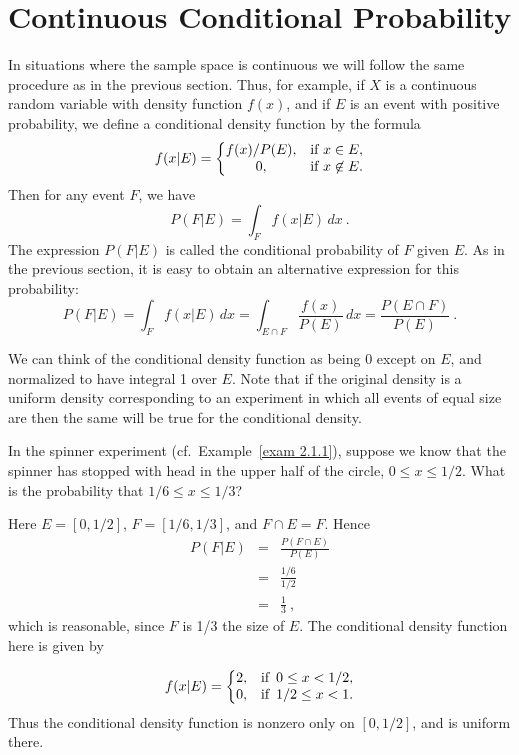 \begin{LJSItem}
\end{LJSItem}

\section{Continuous Conditional Probability}\label{sec 4.2}

In situations where the sample space is continuous we will follow the same procedure as in the
previous section.  Thus, for example, if $X$ is a continuous random variable with density function
$f(x)$, and if $E$ is an event with positive probability, we define a conditional
density function by the formula
$$ f(x|E) = \left \{ \begin{matrix}
 f(x)/P(E), &  \mbox{if} \,\,x \in E,       \cr
         0, & \mbox{if}\,\,x \not \in E.  \cr\end{matrix}\right.        
$$
Then for any event $F$, we have
$$ 
P(F|E) = \int_F f(x|E)\,dx\ .
$$
The expression $P(F|E)$ is called the conditional probability of $F$ given $E$.  As in the previous
section, it is easy to obtain an alternative expression for this probability:
$$
P(F|E) = \int_F f(x|E)\,dx = \int_{E\cap F} \frac {f(x)}{P(E)}\,dx = \frac {P(E\cap F)}{P(E)}\ .
$$
\par
We can think of the conditional density function as being 0 except on $E$, and
normalized to have integral 1 over $E$.  Note that if the original density is a
uniform density corresponding to an experiment in which all events of equal
size are  then the same will be true for the conditional
density.

\begin{example}\label{exam 4.12}
In the spinner experiment (cf.\ Example~\ref{exam 2.1.1}),
suppose we know that the spinner has stopped with head in the upper half of the
circle, $0 \leq x \leq 1/2$.  What is the probability that $1/6 \leq x
\leq 1/3$?

Here $E = [0,1/2]$, $F = [1/6,1/3]$, and $F \cap E = F$.  Hence
\begin{eqnarray*}
P(F|E) &=& \frac {P(F \cap E)}{P(E)} \\
       &=& \frac {1/6}{1/2} \\
       &=& \frac 13\ ,
\end{eqnarray*}
which is reasonable, since $F$ is 1/3 the size of $E$.  The conditional density
function here is given by

$$
f(x|E) =  \left \{ \begin{matrix}
               2, & \mbox{if}\,\,\, 0   \leq x < 1/2, \cr
               0, & \mbox{if}\,\,\, 1/2 \leq x < 1.\cr\end{matrix}\right.
$$
Thus the conditional density function is nonzero only on $[0,1/2]$, and is
uniform there.
\end{example}

